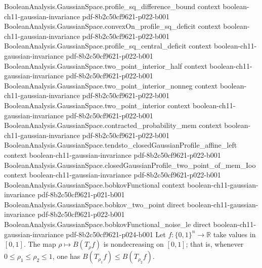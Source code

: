 \begin{theorem}
  {BooleanAnalysis.GaussianSpace.profile_sq_difference_bound}
  {context}
  {boolean-ch11-gaussian-invariance}
  {pdf-8b2c50cf9621-p022-b001}
\proofstep
  {BooleanAnalysis.GaussianSpace.convexOn_profile_sq_deficit}
  {context}
  {boolean-ch11-gaussian-invariance}
  {pdf-8b2c50cf9621-p022-b001}
\proofstep
  {BooleanAnalysis.GaussianSpace.profile_sq_central_deficit}
  {context}
  {boolean-ch11-gaussian-invariance}
  {pdf-8b2c50cf9621-p022-b001}
\proofstep
  {BooleanAnalysis.GaussianSpace.two_point_interior_half}
  {context}
  {boolean-ch11-gaussian-invariance}
  {pdf-8b2c50cf9621-p022-b001}
\proofstep
  {BooleanAnalysis.GaussianSpace.two_point_interior_nonneg}
  {context}
  {boolean-ch11-gaussian-invariance}
  {pdf-8b2c50cf9621-p022-b001}
\proofstep
  {BooleanAnalysis.GaussianSpace.two_point_interior}
  {context}
  {boolean-ch11-gaussian-invariance}
  {pdf-8b2c50cf9621-p022-b001}
\proofstep
  {BooleanAnalysis.GaussianSpace.contracted_probability_mem}
  {context}
  {boolean-ch11-gaussian-invariance}
  {pdf-8b2c50cf9621-p022-b001}
\proofstep
  {BooleanAnalysis.GaussianSpace.tendsto_closedGaussianProfile_affine_left}
  {context}
  {boolean-ch11-gaussian-invariance}
  {pdf-8b2c50cf9621-p022-b001}
\proofstep
  {BooleanAnalysis.GaussianSpace.closedGaussianProfile_two_point_of_mem_Ioo}
  {context}
  {boolean-ch11-gaussian-invariance}
  {pdf-8b2c50cf9621-p022-b001}
\proofstep
  {BooleanAnalysis.GaussianSpace.bobkovFunctional}
  {context}
  {boolean-ch11-gaussian-invariance}
  {pdf-8b2c50cf9621-p021-b001}
\proofstep
  {BooleanAnalysis.GaussianSpace.bobkov_two_point}
  {direct}
  {boolean-ch11-gaussian-invariance}
  {pdf-8b2c50cf9621-p022-b001}
\proofstep
  {BooleanAnalysis.GaussianSpace.bobkovFunctional_noise_le}
  {direct}
  {boolean-ch11-gaussian-invariance}
  {pdf-8b2c50cf9621-p024-b001}
Let $f:\{0,1\}^n\to\mathbb R$ take values in $[0,1]$. The map $\rho\mapsto B(T_\rho f)$
is nondecreasing on $[0,1]$; that is, whenever $0\le\rho_1\le\rho_2\le1$, one has
$B(T_{\rho_1}f)\le B(T_{\rho_2}f)$.
\end{theorem}
